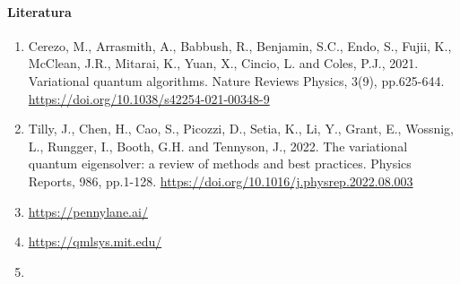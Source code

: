 \documentclass[a4paper,11pt
]{article}
\begin{document}
\hypertarget{literatura}{%
\paragraph{Literatura}\label{literatura}}

\begin{enumerate}
\def\labelenumi{\arabic{enumi}.}

\item Cerezo, M., Arrasmith, A., Babbush, R., Benjamin, S.C., Endo, S., Fujii, K., McClean, J.R., Mitarai, K., Yuan, X., Cincio, L. and Coles, P.J., 2021. Variational quantum algorithms. Nature Reviews Physics, 3(9), pp.625-644. \url{https://doi.org/10.1038/s42254-021-00348-9}

\item Tilly, J., Chen, H., Cao, S., Picozzi, D., Setia, K., Li, Y., Grant, E., Wossnig, L., Rungger, I., Booth, G.H. and Tennyson, J., 2022. The variational quantum eigensolver: a review of methods and best practices. Physics Reports, 986, pp.1-128. \url{https://doi.org/10.1016/j.physrep.2022.08.003}

\item \url{https://pennylane.ai/}

\item \url{https://qmlsys.mit.edu/}

\item 
\end{enumerate}
\end{document}
